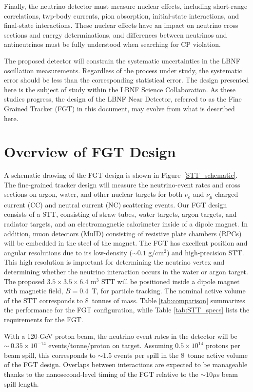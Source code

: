 Finally, the neutrino detector must measure nuclear effects, including
short-range correlations, twp-body currents, pion absorption, initial-state interactions, 
and final-state interactions. These nuclear effects %
have an impact on neutrino cross sections and energy determinations, and differences
between neutrinos and antineutrinos must be fully understood when searching
for CP violation.

The proposed detector will constrain the systematic uncertainties in the LBNF 
oscillation measurements. Regardless of the process under study, the 
systematic error should be less than the corresponding statistical error. 
The design presented here is the subject of study within the LBNF Science 
Collaboration. As these studies 
progress, the design of the LBNF Near Detector, 
referred to as the Fine Grained Tracker (FGT) in this document, may 
evolve from what is described here. 

\section{Overview of FGT Design}

A schematic drawing of the 
FGT design is shown in Figure~\ref{STT_schematic}. 
The fine-grained tracker 
design will measure the neutrino-event rates and cross sections 
on argon, water, and other nuclear 
targets for both $\nu_e$ and $\nu_\mu$ charged current (CC) and
neutral current (NC) scattering events. Our FGT design 
consists of a STT, consisting of straw tubes, water targets, argon targets, 
and radiator targets, and an electromagnetic calorimeter inside of a
dipole magnet. In addition, muon detectors (MuID) consisting of resistive plate
chambers (RPCs) will be embedded in the steel
of the magnet. The FGT has excellent position and angular resolutions due to
its low-density ($\sim 0.1$ g/cm$^2$) and high-precision STT. This high 
resolution is important for determining the neutrino
vertex and determining whether the neutrino interaction occurs in the water
or argon target.  The
proposed $3.5\times3.5\times6.4$ m$^3$ STT will be positioned inside a 
dipole magnet with magnetic field, $B = 0.4$~T, for particle tracking.
The nominal active volume of the STT corresponds to 8~tonnes of mass.
Table \ref{tab:comparison} summarizes the
performance for the FGT configuration, while
Table \ref{tab:STT_specs} lists the requirements for the FGT.

With a 120-GeV proton beam, the neutrino event rates in the detector
will be $\sim~0.35\times 10^{-14}$ events/tonne/proton on target.
Assuming $0.5\times 10^{14}$ protons per beam spill, this corresponds
to $\sim 1.5$ events per spill in the 8~tonne active volume of the FGT
design.  Overlaps between interactions are expected to be
manageable thanks to the nanosecond-level timing of the FGT relative to
the $\sim 10 \mu$s beam spill length.

